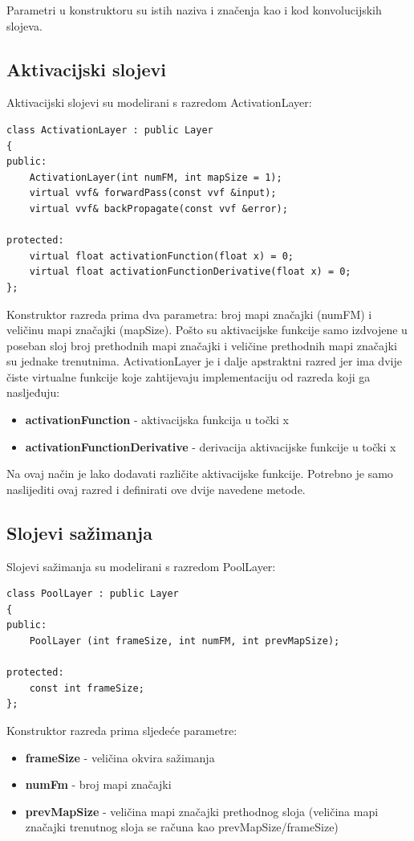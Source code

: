 \documentclass[times, utf8, zavrsni, numeric]{fer}
\begin{document}
Parametri u konstruktoru su istih naziva i značenja kao i kod konvolucijskih slojeva.

\subsection{Aktivacijski slojevi}
Aktivacijski slojevi su modelirani s razredom ActivationLayer:
\begin{lstlisting}[caption=Razred ActivationLayer,
  label=ActivationLayer]
class ActivationLayer : public Layer
{
public:
    ActivationLayer(int numFM, int mapSize = 1);
    virtual vvf& forwardPass(const vvf &input);
    virtual vvf& backPropagate(const vvf &error);

protected:
    virtual float activationFunction(float x) = 0;
    virtual float activationFunctionDerivative(float x) = 0;
};
\end{lstlisting}

Konstruktor razreda prima dva parametra: broj mapi značajki (numFM) i veličinu mapi značajki (mapSize). Pošto su aktivacijske funkcije samo izdvojene u poseban sloj broj prethodnih mapi značajki i veličine prethodnih mapi značajki su jednake trenutnima. ActivationLayer je i dalje apstraktni razred jer ima dvije čiste virtualne funkcije koje zahtijevaju implementaciju od razreda koji ga nasljeđuju:
\begin{itemize}
\item \textbf{activationFunction} - aktivacijska funkcija u točki x
\item \textbf{activationFunctionDerivative} - derivacija aktivacijske funkcije u točki x
\end{itemize}
Na ovaj način je lako dodavati različite aktivacijske funkcije. Potrebno je samo naslijediti ovaj razred i definirati ove dvije navedene metode.


\subsection{Slojevi sažimanja}
Slojevi sažimanja su modelirani s razredom PoolLayer:
\begin{lstlisting}[caption=Razred PoolLayer,
  label=PoolLayer]
class PoolLayer : public Layer
{
public:
    PoolLayer (int frameSize, int numFM, int prevMapSize); 

protected:
    const int frameSize;
};
\end{lstlisting}

Konstruktor razreda prima sljedeće parametre:
\begin{itemize}
\item \textbf{frameSize} - veličina okvira sažimanja
\item \textbf{numFm} - broj mapi značajki
\item \textbf{prevMapSize} - veličina mapi značajki prethodnog sloja (veličina mapi značajki trenutnog sloja se računa kao prevMapSize/frameSize)
\end{itemize}
\end{document}
